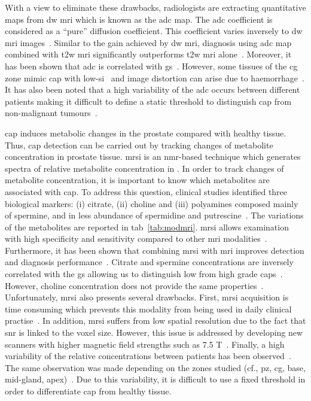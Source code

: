 With a view to eliminate these drawbacks, radiologists are extracting quantitative maps from \ac{dw} \ac{mri} which is known as the \ac{adc} map. The \ac{adc} coefficient is considered as a ``pure'' diffusion coefficient. This coefficient varies inversely to \ac{dw} \ac{mri} images~\cite{Barentsz2012}. %
Similar to the gain achieved by \ac{dw} \ac{mri}, diagnosis using \ac{adc} map combined with \ac{t2w} \ac{mri} significantly outperforms \ac{t2w} \ac{mri} alone~\cite{Doo2012,Choi2007}. Moreover, it has been shown that \ac{adc} is correlated with \ac{gs}~\cite{Hambrock2011, Itou2011, Peng2013}. However, some tissues of the \ac{cg} zone mimic \ac{cap} with low-\ac{si}~\cite{Kirkham2006} and image distortion can arise due to haemorrhage~\cite{Choi2007}. It has also been noted that a high variability of the \ac{adc} occurs between different patients making it difficult to define a static threshold to distinguish \ac{cap} from non-malignant tumours~\cite{Choi2007}.

\ac{cap} induces metabolic changes in the prostate compared with healthy tissue. Thus, \ac{cap} detection can be carried out by tracking changes of metabolite concentration in prostate tissue. \ac{mrsi} is an \ac{nmr}-based technique which generates spectra of relative metabolite concentration in . In order to track changes of metabolite concentration, it is important to know which metabolites are associated with \ac{cap}. To address this question, clinical studies identified three biological markers: (i) citrate, (ii) choline and (iii) polyamines composed mainly of spermine, and in less abundance of spermidine and putrescine~\cite{Awwad2012,Costello2006,Giskeodegard2013}. The variations of the metabolites are reported in \ac{tab}~\ref{tab:modmri}. %
\ac{mrsi} allows examination with high specificity and sensitivity compared to other \ac{mri} modalities~\cite{Choi2007}. Furthermore, it has been shown that combining \ac{mrsi} with \ac{mri} improves detection and diagnosis performance~\cite{Scheidler1999a,Kaji1998,Vilanova2009}. Citrate and spermine concentrations are inversely correlated with the \ac{gs} allowing us to distinguish low from high grade \acp{cap}~\cite{Giskeodegard2013}. However, choline concentration does not provide the same properties~\cite{Giskeodegard2013}. Unfortunately, \ac{mrsi} also presents several drawbacks. First, \ac{mrsi} acquisition is time consuming which prevents this modality from being used in daily clinical practise~\cite{Barentsz2012}. In addition, \ac{mrsi} suffers from low spatial resolution due to the fact that \ac{snr} is linked to the voxel size. However, this issue is addressed by developing new scanners with higher magnetic field strengths such as 7.5 T~\cite{Giskeodegard2013}. Finally, a high variability of the relative concentrations between patients has been observed~\cite{Choi2007}. The same observation was made depending on the zones studied (cf., \ac{pz}, \ac{cg}, base, mid-gland, apex)~\cite{Walker2010,Lemaitre2011}. Due to this variability, it is difficult to use a fixed threshold in order to differentiate \ac{cap} from healthy tissue.

